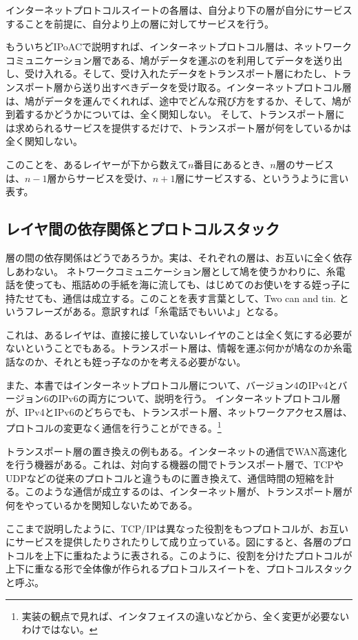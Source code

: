 インターネットプロトコルスイートの各層は、自分より下の層が自分にサービスすることを前提に、自分より上の層に対してサービスを行う。

もういちどIPoACで説明すれば、インターネットプロトコル層は、ネットワークコミュニケーション層である、鳩がデータを運ぶのを利用してデータを送り出し、受け入れる。そして、受け入れたデータをトランスポート層にわたし、トランスポート層から送り出すべきデータを受け取る。インターネットプロトコル層は、鳩がデータを運んでくれれば、途中でどんな飛び方をするか、そして、鳩が到着するかどうかについては、全く関知しない。
そして、トランスポート層には求められるサービスを提供するだけで、トランスポート層が何をしているかは全く関知しない。

このことを、あるレイヤーが下から数えて$n$番目にあるとき、$n$層のサービスは、$n-1$層からサービスを受け、$n+1$層にサービスする、といううように言い表す。

\subsection{レイヤ間の依存関係とプロトコルスタック}

層の間の依存関係はどうであろうか。実は、それぞれの層は、お互いに全く依存しあわない。
ネトワークコミュニケーション層として鳩を使うかわりに、糸電話を使っても、瓶詰めの手紙を海に流しても、はじめてのお使いをする姪っ子に持たせても、通信は成立する。このことを表す言葉として、Two can and tin. というフレーズがある。意訳すれば「糸電話でもいいよ」となる。

これは、あるレイヤは、直接に接していないレイヤのことは全く気にする必要がないということでもある。トランスポート層は、情報を運ぶ何かが鳩なのか糸電話なのか、それとも姪っ子なのかを考える必要がない。

また、本書ではインターネットプロトコル層について、バージョン4のIPv4とバージョン6のIPv6の両方について、説明を行う。
インターネットプロトコル層が、IPv4とIPv6のどちらでも、トランスポート層、ネットワークアクセス層は、プロトコルの変更なく通信を行うことができる。\footnote{実装の観点で見れば、インタフェイスの違いなどから、全く変更が必要ないわけではない。}

トランスポート層の置き換えの例もある。インターネットの通信でWAN高速化を行う機器がある。これは、対向する機器の間でトランスポート層で、TCPやUDPなどの従来のプロトコルと違うものに置き換えて、通信時間の短縮を計る。このような通信が成立するのは、インターネット層が、トランスポート層が何をやっているかを関知しないためである。

ここまで説明したように、TCP/IPは異なった役割をもつプロトコルが、お互いにサービスを提供したりされたりして成り立っている。図にすると、各層のプロトコルを上下に重ねたように表される。このように、役割を分けたプロトコルが上下に重なる形で全体像が作られるプロトコルスイートを、プロトコルスタックと呼ぶ。


